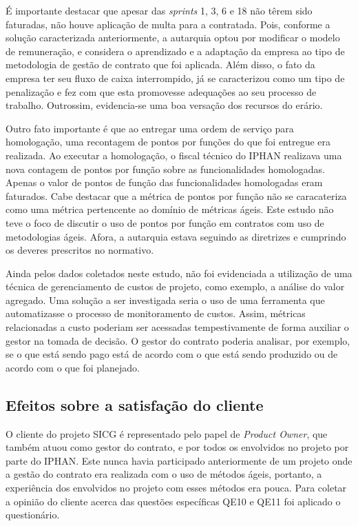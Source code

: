 É importante destacar que apesar das \textit{sprints} 1, 3, 6 e 18 não têrem sido faturadas, não houve aplicação de multa para a contratada. Pois, conforme a solução caracterizada anteriormente, a autarquia optou por modificar o modelo de remuneração, e considera o aprendizado e a adaptação da empresa ao tipo de metodologia de gestão de contrato que foi aplicada. Além disso, o fato da empresa ter seu fluxo de caixa interrompido, já se caracterizou como um tipo de penalização e fez com que esta promovesse adequações ao seu processo de trabalho. Outrossim, evidencia-se uma boa versação dos recursos do erário.

Outro fato importante é que ao entregar uma ordem de serviço para homologação, uma recontagem de pontos por funções do que foi entregue era realizada. Ao executar a homologação, o fiscal técnico do IPHAN realizava uma nova contagem de pontos por função sobre as funcionalidades homologadas. Apenas o valor de pontos de função das funcionalidades homologadas eram faturados. Cabe destacar que a métrica de pontos por função não se caracateriza como uma métrica pertencente ao domínio de métricas ágeis. Este estudo não teve o foco de discutir o uso de pontos por função em contratos com uso de metodologias ágeis. Afora, a autarquia estava seguindo as diretrizes e cumprindo os deveres prescritos no normativo.

Ainda pelos dados coletados neste estudo, não foi evidenciada a utilização de uma técnica de gerenciamento de custos de projeto, como exemplo, a análise do valor agregado. Uma solução a ser investigada seria o uso de uma ferramenta que automatizasse o processo de monitoramento de custos. Assim, métricas relacionadas a custo poderiam ser acessadas tempestivamente de forma auxiliar o gestor na tomada de decisão. O gestor do contrato poderia analisar, por exemplo, se o que está sendo pago está de acordo com o que está sendo produzido ou de acordo com o que foi planejado.

\subsection[Efeitos sobre a satisfação do cliente]{Efeitos sobre a satisfação do cliente}

O cliente do projeto SICG é representado pelo papel de \textit{Product Owner}, que também atuou como gestor do contrato, e por todos os envolvidos no projeto por parte do IPHAN. Este nunca havia participado anteriormente de um projeto onde a gestão do contrato era realizada com o uso de métodos ágeis, portanto, a experiência dos envolvidos no projeto com esses métodos era pouca. Para coletar a opinião do cliente acerca das questões específicas QE10  e QE11 foi aplicado o questionário.

